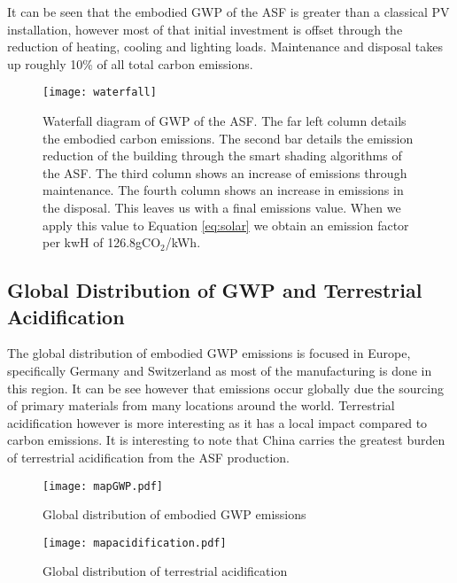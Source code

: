 It can be seen that the embodied GWP of the ASF is greater than a classical PV installation, however most of that initial investment is offset through the reduction of heating, cooling and lighting loads. Maintenance and disposal takes up roughly 10\% of all total carbon emissions.


\begin{figure}[H]
\begin{center}
\texttt{[image: waterfall]}
\caption{Waterfall diagram of GWP of the ASF. The far left column details the embodied carbon emissions. The second bar details the emission reduction of the building through the smart shading algorithms of the ASF. The third column shows an increase of emissions through maintenance. The fourth column shows an increase in emissions in the disposal. This leaves us with a final emissions value. When we apply this value to Equation \ref{eq:solar} we obtain an emission factor per kwH of 126.8gCO$_2$/kWh.}
\label{fig:waterfall}
\end{center}
\end{figure}

\subsection{Global Distribution of GWP and Terrestrial Acidification}

The global distribution of embodied GWP emissions is focused in Europe, specifically Germany and Switzerland as most of the manufacturing is done in this region. It can be see however that emissions occur globally due the sourcing of primary materials from many locations around the world. Terrestrial acidification however is more interesting as it has a local impact compared to carbon emissions. It is interesting to note that China carries the greatest burden of terrestrial acidification from the ASF production. 
\begin{figure}[H]
\begin{center}
\texttt{[image: mapGWP.pdf]}
\caption{Global distribution of embodied GWP emissions}
\label{fig:mapGWP}
\end{center}
\end{figure}

\begin{figure}[H]
\begin{center}
\texttt{[image: mapacidification.pdf]}
\caption{Global distribution of terrestrial acidification}
\label{fig:mapAcid}
\end{center}
\end{figure}



